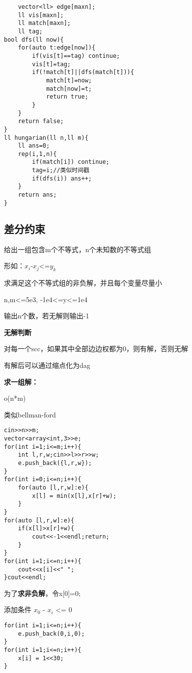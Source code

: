 \documentclass[]{article}
\begin{document}
\begin{verbatim}
    vector<ll> edge[maxn];
    ll vis[maxn];
    ll match[maxn];
    ll tag;
bool dfs(ll now){
    for(auto t:edge[now]){
        if(vis[t]==tag) continue;
        vis[t]=tag;
        if(!match[t]||dfs(match[t])){
            match[t]=now;
            match[now]=t;
            return true;
        }
    }
    return false;
}
ll hungarian(ll n,ll m){
    ll ans=0;
    rep(i,1,n){
        if(match[i]) continue;
        tag=i;//类似时间戳
        if(dfs(i)) ans++;
    }
    return ans;
}
\end{verbatim}

\hypertarget{ux5deeux5206ux7ea6ux675f}{%
\subsection{差分约束}\label{ux5deeux5206ux7ea6ux675f}}

给出一组包含m个不等式，n个未知数的不等式组

​形如：\(x_i\)-\(x_j\)\textless{}=\(y_k\)

求满足这个不等式组的非负解，并且每个变量尽量小

n,m\textless{}=5e3, -1e4\textless{}=y\textless{}=1e4

输出n个数，若无解则输出-1

\textbf{无解判断}

对每一个scc，如果其中全部边边权都为0，则有解，否则无解

有解后可以通过缩点化为dag

\textbf{求一组解：}

o(n*m)

类似bellman-ford

\begin{verbatim}
cin>>n>>m;
vector<array<int,3>>e;
for(int i=1;i<=m;i++){
    int l,r,w;cin>>l>>r>>w;
    e.push_back({l,r,w});
}
for(int i=0;i<=n;i++){
    for(auto [l,r,w]:e){
        x[l] = min(x[l],x[r]+w);
    }
}
for(auto [l,r,w]:e){
    if(x[l]>x[r]+w){
        cout<<-1<<endl;return;
    }
}
for(int i=1;i<=n;i++){
    cout<<x[i]<<" ";
}cout<<endl;
\end{verbatim}

为了\textbf{求非负解}，令x{[}0{]}=0;

添加条件 \(x_0\) - \(x_i\) \textless{}= 0

\begin{verbatim}
for(int i=1;i<=n;i++){
    e.push_back(0,i,0);
}
for(int i=1;i<=n;i++){
    x[i] = 1<<30;
}
\end{verbatim}
\end{document}
